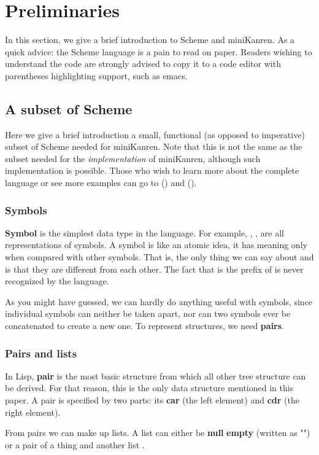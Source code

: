 \section{Preliminaries}
In this section, we give a brief introduction to Scheme and miniKanren.
As a quick advice: the Scheme language is a pain to read on paper.
Readers wishing to understand the code are strongly advised to copy it to a code editor with parentheses highlighting support, such as emacs.

\subsection{A subset of Scheme}
Here we give a brief introduction a small, functional (as opposed to imperative) subset of Scheme needed for miniKanren. Note that this is not the same as the subset needed for the \emph{implementation} of miniKanren, although such implementation is possible.
Those who wish to learn more about the complete language or see more examples can go to (\cite{tspl4}) and (\cite{sicp}).

\subsubsection{Symbols}
\textbf{Symbol} is the simplest data type in the language. For example, , ,  are all representations of symbols.
A symbol is like an atomic idea, it has meaning only when compared with other symbols. That is, the only thing we can say about  and  is that they are different from each other. The fact that  is the prefix of  is never recognized by the language.

As you might have guessed, we can hardly do anything useful with symbols, since individual symbols can neither be taken apart, nor can two symbols ever be concatenated to create a new one. To represent structures, we need \textbf{pairs}.

\subsubsection{Pairs and lists}
In Lisp, \textbf{pair} is the most basic structure from which all other tree structure can be derived.
For that reason, this is the only data structure mentioned in this paper.
A pair is specified by two parts: its \textbf{car} (the left element) and \textbf{cdr} (the right element).

From pairs we can make up lists. A list can either be \textbf{null} \textbf{empty} (written as "\code{()}") or a pair of a thing  and another list .

